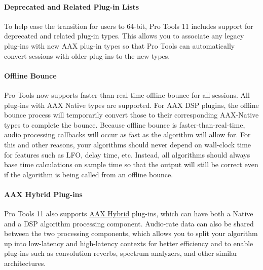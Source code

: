 \hypertarget{a00360_subsubsection__deprecated_and_related_plug-in_lists}{}\paragraph{Deprecated and Related Plug-\/in Lists}\label{a00360_subsubsection__deprecated_and_related_plug-in_lists}
 To help ease the transition for users to 64-\/bit, Pro Tools 11 includes support for deprecated and related plug-\/in types. This allows you to associate any legacy plug-\/ins with new A\+A\+X plug-\/in types so that Pro Tools can automatically convert sessions with older plug-\/ins to the new types.

\hypertarget{a00360_subsubsection__offline_bounce}{}\paragraph{Offline Bounce}\label{a00360_subsubsection__offline_bounce}
 Pro Tools now supports faster-\/than-\/real-\/time offline bounce for all sessions. All plug-\/ins with A\+A\+X Native types are supported. For A\+A\+X D\+S\+P plugins, the offline bounce process will temporarily convert those to their corresponding A\+A\+X-\/\+Native types to complete the bounce. Because offline bounce is faster-\/than-\/real-\/time, audio processing callbacks will occur as fast as the algorithm will allow for. For this and other reasons, your algorithms should never depend on wall-\/clock time for features such as L\+F\+O, delay time, etc. Instead, all algorithms should always base time calculations on sample time so that the output will still be correct even if the algorithm is being called from an offline bounce.

\hypertarget{a00360_subsubsection__aax-hybrid_plug-ins}{}\paragraph{A\+A\+X Hybrid Plug-\/ins}\label{a00360_subsubsection__aax-hybrid_plug-ins}
 Pro Tools 11 also supports \hyperlink{a00335}{A\+A\+X Hybrid} plug-\/ins, which can have both a Native and a D\+S\+P algorithm processing component. Audio-\/rate data can also be shared between the two processing components, which allows you to split your algorithm up into low-\/latency and high-\/latency contexts for better efficiency and to enable plug-\/ins such as convolution reverbs, spectrum analyzers, and other similar architectures.



